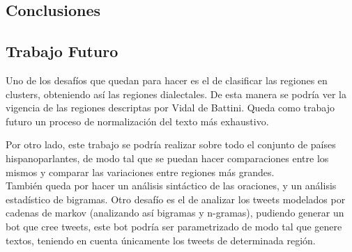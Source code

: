 
\subsection{Conclusiones}


\subsection{Trabajo Futuro}


Uno de los desafíos que quedan para hacer es el de clasificar las regiones en clusters, obteniendo así las regiones dialectales. De esta manera se podría ver la vigencia de las regiones descriptas por Vidal de Battini. %
Queda como trabajo futuro un proceso de normalización del texto más exhaustivo.


Por otro lado, este trabajo se podría realizar sobre todo el conjunto de países hispanoparlantes, de modo tal que se puedan hacer comparaciones entre los mismos y comparar las variaciones entre regiones más grandes.\\

También queda por hacer un análisis sintáctico de las oraciones, y un análisis estadístico de bigramas.
Otro desafío es el de analizar los tweets modelados por cadenas de markov (analizando así bigramas y n-gramas), pudiendo generar un bot que cree tweets, este bot podría ser parametrizado de modo tal que genere textos, teniendo en cuenta únicamente los tweets de determinada región.

